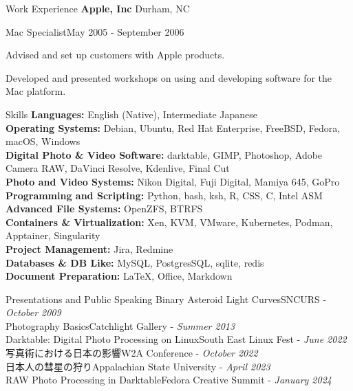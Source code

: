 \documentclass{new_cv} %
\begin{document}
\begin{rSection}{Work Experience}
  {\bf {Apple, Inc}} \hfill { Durham, NC}
   
    \begin{rSubsection}{Mac Specialist}{May 2005 - September 2006}
   	\item Advised and set up customers with Apple products.
   	\item Developed and presented workshops on using and developing software for the Mac platform.
   \end{rSubsection}
   
   \end{rSection}
   


\begin{rSection}{Skills}
	{\bf Languages:} English (Native),  Intermediate Japanese  \\
	{\bf Operating Systems:} Debian, Ubuntu, Red Hat Enterprise, FreeBSD, Fedora, macOS, Windows \\
	{\bf Digital Photo \& Video Software:}  darktable, GIMP, Photoshop, Adobe Camera RAW, DaVinci Resolve, Kdenlive, Final Cut \\
	{\bf Photo and Video Systems:} {Nikon Digital, Fuji Digital, Mamiya 645, GoPro } \\
	{\bf Programming and Scripting:}  Python, bash, ksh, R, CSS, C, Intel ASM \\
	{\bf Advanced File Systems:} OpenZFS, BTRFS \\
	{\bf Containers \& Virtualization:} Xen, KVM, VMware, Kubernetes, Podman, Apptainer, Singularity \\
	{\bf Project Management:} Jira, Redmine \\
	{\bf Databases \& DB Like:} MySQL, PostgresSQL, sqlite, redis \\
	{\bf Document Preparation:} \LaTeX, Office, Markdown
\end{rSection}

\pagebreak

\begin{rSection}
	{Presentations and Public Speaking}
	{Binary Asteroid Light Curves}\hfill{SNCURS - {\em October 2009}}\\
	{Photography Basics}\hfill{Catchlight Gallery - {\em Summer 2013}}\\
	{Darktable: Digital Photo Processing on Linux}\hfill{South East Linux Fest - {\em June 2022}}\\
	{写真術における日本の影響}\hfill{W2A Conference - {\em October 2022}}\\
	{日本人の彗星の狩り}\hfill{Appalachian State University - {\em April 2023}}\\
	{RAW Photo Processing in Darktable}\hfill{Fedora Creative Summit} - {\em January 2024}
\end{rSection}
\end{document}
